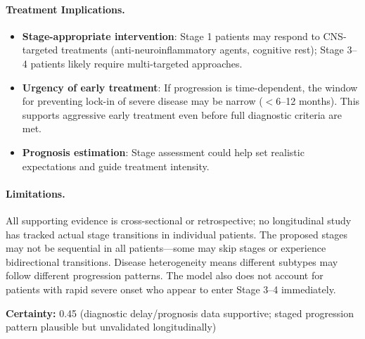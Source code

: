 \begin{hypothesis}
\paragraph{Treatment Implications.}
\begin{itemize}
    \item \textbf{Stage-appropriate intervention}: Stage 1 patients may respond to CNS-targeted treatments (anti-neuroinflammatory agents, cognitive rest); Stage 3--4 patients likely require multi-targeted approaches.
    \item \textbf{Urgency of early treatment}: If progression is time-dependent, the window for preventing lock-in of severe disease may be narrow ($<$6--12 months). This supports aggressive early treatment even before full diagnostic criteria are met.
    \item \textbf{Prognosis estimation}: Stage assessment could help set realistic expectations and guide treatment intensity.
\end{itemize}

\paragraph{Limitations.}
All supporting evidence is cross-sectional or retrospective; no longitudinal study has tracked actual stage transitions in individual patients. The proposed stages may not be sequential in all patients---some may skip stages or experience bidirectional transitions. Disease heterogeneity means different subtypes may follow different progression patterns. The model also does not account for patients with rapid severe onset who appear to enter Stage 3--4 immediately.

\textbf{Certainty:} 0.45 (diagnostic delay/prognosis data supportive; staged progression pattern plausible but unvalidated longitudinally)
\end{hypothesis}


